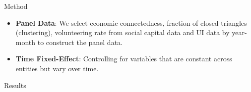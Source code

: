 \documentclass[xcolor=dvipsnames]{beamer} %
\begin{document}
\begin{frame}{}
\begin{columns}[t]
\begin{column}{.3\linewidth}
\begin{block}{\LARGE Method}
    \begin{itemize}
        \item \textbf{Panel Data}:
        We select economic connectedness, fraction of closed triangles (clustering), volunteering rate from social capital data and UI data by year-month to construct the panel data.
        
        \item \textbf{Time Fixed-Effect}:
        Controlling for variables that are constant across entities but vary over time. 


       

        
        
    \end{itemize}
    
    
      \end{block}

    \begin{block}{\LARGE Results}


\end{block}
\end{column}
\end{columns}
\end{frame}
\end{document}
